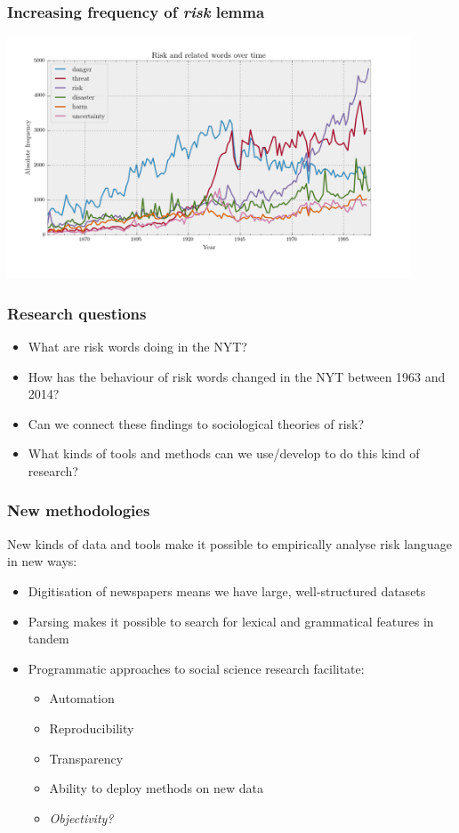 \documentclass{beamer}       %
\begin{document}
\begin{frame}
    \frametitle{Increasing frequency of \emph{risk} lemma}
    \centering
    \includegraphics[width=0.90\textwidth]{../../images/risk_related_june_colour}
\end{frame}

\begin{frame}
    \frametitle{Research questions}

    \begin{itemize}
        \item What are risk words doing in the NYT?
        \item How has the behaviour of risk words changed in the NYT between 1963 and 2014?
        \item Can we connect these findings to sociological theories of risk?
        \item What kinds of tools and methods can we use\slash develop to do this kind of research?
    \end{itemize}
\end{frame}

\begin{frame}
    \frametitle{New methodologies}

    New kinds of data and tools make it possible to empirically analyse risk language in new ways:
    
    \begin{itemize}
    \item Digitisation of newspapers means we have large, well-structured datasets
    \item Parsing makes it possible to search for lexical and grammatical features in tandem
    \item Programmatic approaches to social science research facilitate:
    \begin{itemize}
        \item Automation
        \item Reproducibility
        \item Transparency
        \item Ability to deploy methods on new data
        \item \emph{Objectivity?}
    \end{itemize}
    \end{itemize}

\end{frame}
\end{document}
